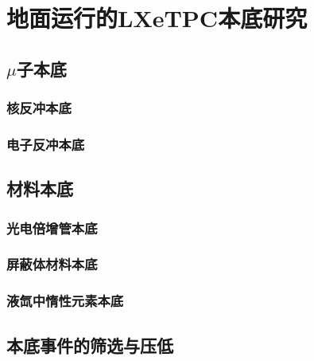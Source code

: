 
\chapter{地面运行的LXeTPC本底研究}
\label{sec:backgrounds}

\section{$\mu$子本底}

\subsection{核反冲本底}

\subsection{电子反冲本底}

\section{材料本底}

\subsection{光电倍增管本底}

\subsection{屏蔽体材料本底}

\subsection{液氙中惰性元素本底}

\section{本底事件的筛选与压低}
